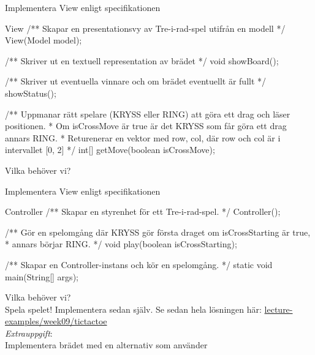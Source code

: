 \documentclass{lecturenotes}
\begin{document}
\begin{Slide}{Implementera View enligt specifikationen}
\begin{ClassSpec}{View}
/** Skapar en presentationsvy av Tre-i-rad-spel utifrån en modell */
View(Model model);

/** Skriver ut en textuell representation av brädet */
void showBoard();

/** Skriver ut eventuella vinnare och om brädet eventuellt är fullt */
showStatus();

/** Uppmanar rätt spelare (KRYSS eller RING) att göra ett drag och läser positionen.
*   Om isCrossMove är true är det KRYSS som får göra ett drag annars RING.
*   Returenerar en vektor med {row, col}, där row och col är i intervallet [0, 2]  */
int[] getMove(boolean isCrossMove);
\end{ClassSpec}
\vspace{2em}
\footnotesize Vilka  behöver vi? 
\end{Slide}

\begin{Slide}{Implementera View enligt specifikationen}
\begin{ClassSpec}{Controller}
/** Skapar en styrenhet för ett Tre-i-rad-spel. */
Controller(); 

/** Gör en spelomgång där KRYSS gör första draget om isCrossStarting är true,
*   annars börjar RING. */
void play(boolean isCrossStarting);

/** Skapar en Controller-instans och kör en spelomgång. */
static void main(String[] args);
\end{ClassSpec}
\vspace{2em}
\footnotesize Vilka  behöver vi?  \\
\vspace{1em}
Spela spelet! Implementera sedan själv. Se sedan hela lösningen här:
\href{https://github.com/bjornregne§ll/lth-eda016-2015/tree/master/lectures/examples/eclipse-ws/lecture-examples/src/week09/tictactoe}{lecture-examples/week09/tictactoe} \\
\vspace{1em}
\textit{Extrauppgift}: \\Implementera brädet med en alternativ  som använder 
\end{Slide}
\end{document}
